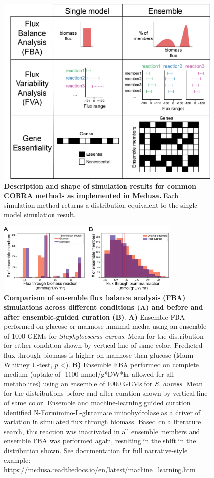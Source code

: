 \documentclass[11pt,onecolumn,notitlepage,openany,twoside]{book}
\begin{document}
\begin{refsection}
\begin{figure}[tb]
\centering
\includegraphics[width=0.7\linewidth]{ch4_fig2}
\caption[ Description and shape of simulation results for common COBRA methods as implemented in Medusa.]{\textbf{ Description and shape of simulation results for common COBRA methods as implemented in Medusa.} Each simulation method returns a distribution-equivalent to the single-model simulation result.}
\end{figure}

\begin{figure}[tb]
\centering
\includegraphics[width=0.8\textwidth]{ch4_fig3}
\caption[ Comparison of ensemble flux balance analysis (FBA) simulations across different conditions (A) and before and after ensemble-guided curation (B).]{\textbf{ Comparison of ensemble flux balance analysis (FBA) simulations across different conditions (A) and before and after ensemble-guided curation (B).} \textbf{A)} Ensemble FBA performed on glucose or mannose minimal media using an ensemble of 1000 GEMs for \textit{Staphylococcus aureus}. Mean for the distribution for either condition shown by vertical line of same color. Predicted flux through biomass is higher on mannose than glucose (Mann-Whitney U-test, \textit{p} \textless{}). \textbf{B)} Ensemble FBA performed on complete medium (uptake of -1000 mmol/g*DW*hr allowed for all metabolites) using an ensemble of 1000 GEMs for \textit{S. aureus}. Mean for the distributions before and after curation shown by vertical line of same color. Ensemble and machine-learning guided curation identified N-Formimino-L-glutamate iminohydrolase as a driver of variation in simulated flux through biomass. Based on a literature search, this reaction was inactivated in all ensemble members and ensemble FBA was performed again, resulting in the shift in the distribution shown. See documentation for full narrative-style example: \url{https://medusa.readthedocs.io/en/latest/machine_learning.html}.}
\end{figure}



\end{refsection}
\end{document}
